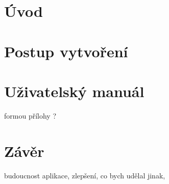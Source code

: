 \documentclass[czech,maturita,a4paper]{diploma}
\begin{document}
\MakeTitlePages

\chapter{Úvod}


\chapter{Postup vytvoření}



\chapter{Uživatelský manuál}
formou přílohy ?

\chapter{Závěr}
budoucnost aplikace, zlepšení, co bych udělal jinak, 

\printbibliography[title={Literatura}]

\newpage
\listoftodos[TODOS]
\end{document}
